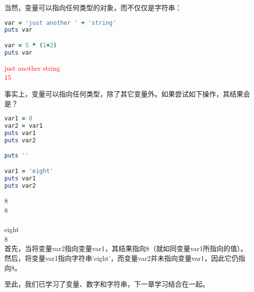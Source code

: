 当然，变量可以指向任何类型的对象，而不仅仅是字符串：
\begin{lstlisting}[language=ruby]
var = 'just another ' + 'string'
puts var

var = 5 * (1+2)
puts var
\end{lstlisting}
\textcolor{red}{
just another string\\
15
}

事实上，变量可以指向任何类型，除了其它变量外。如果尝试如下操作，其结果会是？
\begin{lstlisting}[language=ruby]
var1 = 8
var2 = var1
puts var1
puts var2

puts ''

var1 = 'eight'
puts var1
puts var2
\end{lstlisting}
8\\
8\\
\\
eight\\
8\\

首先，当将变量var2指向变量var1，其结果指向8（就如同变量var1所指向的值）。然后，将变量var1指向字符串`eight'，而变量var2并未指向变量var1，因此它仍指向8。

至此，我们已学习了变量、数字和字符串，下一章学习结合在一起。
